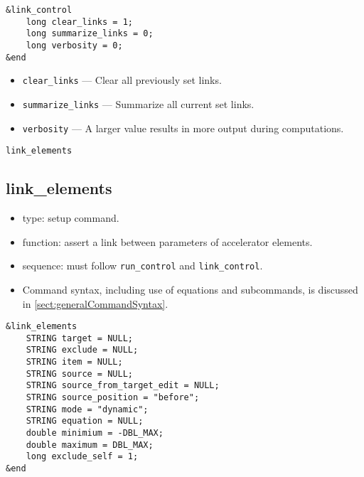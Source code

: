 \documentclass[11pt]{article}
\begin{document}
\begin{verbatim}
&link_control
    long clear_links = 1;
    long summarize_links = 0;
    long verbosity = 0;
&end
\end{verbatim}

\begin{itemize}
\item \verb|clear_links| --- Clear all previously set links.
\item \verb|summarize_links| --- Summarize all current set links.
\item \verb|verbosity| --- A larger value results in more output
during computations.

\end{itemize}

\newpage
\begin{center}{\Large\verb|link_elements|}\end{center}
\subsection{link\_elements \label{subsec:linkelements}}

\begin{itemize}
\item type: setup command.
\item function: assert a link between parameters of accelerator elements.
\item sequence: must follow \verb|run_control| and \verb|link_control|.
\item Command syntax, including use of equations and subcommands, is discussed in \ref{sect:generalCommandSyntax}.
\end{itemize}

\begin{verbatim}
&link_elements
    STRING target = NULL;
    STRING exclude = NULL;
    STRING item = NULL;
    STRING source = NULL;
    STRING source_from_target_edit = NULL;
    STRING source_position = "before";
    STRING mode = "dynamic";
    STRING equation = NULL;
    double minimium = -DBL_MAX;
    double maximum = DBL_MAX;
    long exclude_self = 1;
&end
\end{verbatim}
\end{document}
